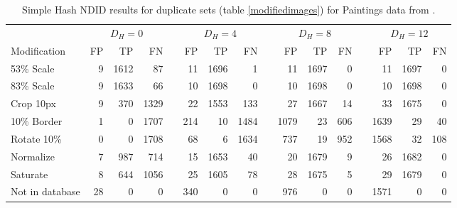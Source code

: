 \documentclass[english,12pt,a4paper,pdftex,elec,utf8]{aaltothesis}
\begin{document}
\begin{table}[htb]\footnotesize
\caption{ Simple Hash NDID results for duplicate sets (table \ref{modifiedimages}) for Paintings data from \cite{Vedaldi2012}. }
\label{simpleresults}
\begin{center}
  \setlength\tabcolsep{3pt} %
  \begin{tabular}{@{}lrrrrrrrrrrrrrrr@{}}
    \toprule
    & \multicolumn{3}{c}{$D_H = 0$} &\phantom{abc} &\multicolumn{3}{c}{$D_H = 4$} &\phantom{abc} & \multicolumn{3}{c}{$D_H=8$} &\phantom{abc} & \multicolumn{3}{c}{$D_H=12$}\\
\cmidrule{2-4} \cmidrule{6-8} \cmidrule{10-12} \cmidrule{14-16}
    Modification & FP & TP & FN &\phantom{abc} & FP & TP & FN &\phantom{abc} & FP & TP & FN &\phantom{abc} & FP & TP & FN\\ \midrule
    53\% Scale   & 9 & 1612 & 87 &\phantom{abc} & 11 & 1696 & 1 &\phantom{abc} & 11 & 1697 & 0 &\phantom{abc} & 11 & 1697 & 0\\
    83\% Scale   & 9 & 1633 & 66 &\phantom{abc} & 10 & 1698 & 0 &\phantom{abc} & 10 & 1698 & 0 &\phantom{abc} & 10 & 1698 & 0\\
    Crop 10px    & 9 & 370 & 1329 &\phantom{abc} & 22 & 1553 & 133 &\phantom{abc} & 27 & 1667 & 14 &\phantom{abc} & 33 & 1675 & 0\\
    10\% Border  & 1 & 0 & 1707 & \phantom{abc} & 214 & 10 & 1484 &\phantom{abc} & 1079 & 23 & 606 &\phantom{abc} & 1639 & 29 & 40\\
    Rotate 10\%  & 0 & 0 & 1708 &\phantom{abc} & 68 & 6 & 1634 &\phantom{abc} & 737 & 19 & 952 &\phantom{abc} & 1568 & 32 & 108\\
    Normalize    & 7 & 987 & 714 &\phantom{abc} & 15 & 1653 & 40 &\phantom{abc} & 20 & 1679 & 9 &\phantom{abc} & 26 & 1682 & 0\\
    Saturate     & 8 & 644 & 1056 &\phantom{abc} & 25 & 1605 & 78 &\phantom{abc} & 28 & 1675 & 5 &\phantom{abc} & 29 & 1679 & 0\\
    Not in database     & 28 & 0 & 0 &\phantom{abc} & 340 & 0 & 0 &\phantom{abc} & 976 & 0 & 0 &\phantom{abc} & 1571& 0& 0\\

    \bottomrule
\end{tabular}
\end{center}
\end{table}
\end{document}
